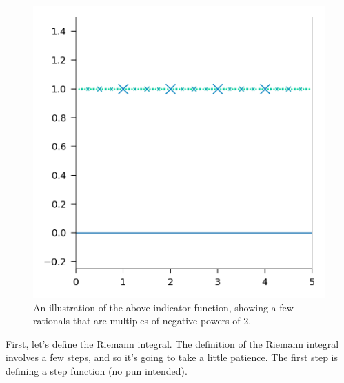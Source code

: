 \begin{figure}[H]
	\centering
	\includegraphics[]{Code/Rational.png}
	\caption{An illustration of the above indicator function, showing a few rationals that are multiples of negative powers of 2.}
\end{figure}

First, let's define the Riemann integral. The definition of the Riemann integral involves a few steps, and so it's going to take a little patience. The first step is defining a step function (no pun intended).

